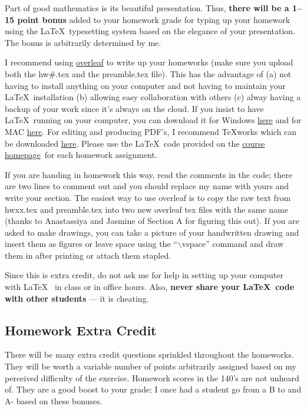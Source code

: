 \documentclass[12pt]{article}
\newcommand{\ingreen}[1]{\color{green}\textbf{#1} \color{black}}
\newcommand{\coursewebpage}{\href{https://github.com/kapelner/QC_Math_241_Fall_2016}{course homepage}}
\newcommand{\qu}[1]{``#1''}
\begin{document}
Part of good mathematics is its beautiful presentation. Thus, \ingreen{there will be a 1--15 point bonus} added to your homework grade  for typing up your homework using the \LaTeX ~typesetting system based on the elegance of your presentation. The bonus is arbitrarily determined by me.

I recommend using \href{http://overleaf.com}{overleaf} to write up your homeworks (make sure you upload both the hw\#.tex and the preamble.tex file). This has the advantage of (a) not having to install anything on your computer and not having to maintain your \LaTeX ~installation (b) allowing easy collaboration with others (c) alway having a backup of your work since it's always on the cloud. If you insist to have \LaTeX ~running on your computer, you can download it for Windows \href{http://www.miktex.org/download}{here} and for MAC \href{http://www.tug.org/mactex/}{here}. For editing and producing PDF's, I recommend \TeX works which can be downloaded \href{http://www.tug.org/texworks/#Getting_TeXworks}{here}. Please use the \LaTeX ~code provided on the \coursewebpage ~for each homework assignment. 

If you are handing in homework this way, read the comments in the code; there are two lines to comment out and you should replace my name with yours and write your section. The easiest way to use overleaf is to copy the raw text from hwxx.tex and preamble.tex into two new overleaf tex files with the same name (thanks to Anastassiya and Jasmine of Section A for figuring this out). If you are asked to make drawings, you can take a picture of your handwritten drawing and insert them as figures or leave space using the \qu{$\backslash$vspace} command and draw them in after printing or attach them stapled.

Since this is extra credit, do not ask me for help in setting up your computer with \LaTeX~ in class or in office hours. Also, \textbf{never share your \LaTeX~code with other students} --- it is cheating.

\subsection*{Homework Extra Credit}

There will be many extra credit questions sprinkled throughout the homeworks. They will be worth a variable number of points arbitrarily assigned based on my perceived difficulty of the exercise. Homework scores in the 140's are not unheard of. They are a good boost to your grade; I once had a student go from a B to and A- based on these bonuses.
\end{document}
